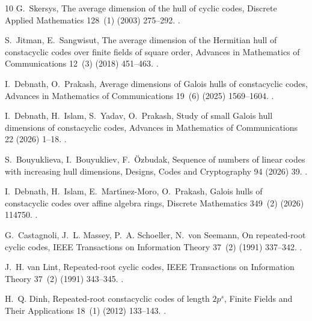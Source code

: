 \documentclass[preprint,12pt,a4paper]{elsarticle}
\theoremstyle{definition}
\theoremstyle{remark}
\begin{document}
\begin{thebibliography}{10}
G.~Skersys, The average dimension of the hull of cyclic codes, Discrete Applied
  Mathematics 128~(1) (2003) 275--292.
\newblock \href {https://doi.org/10.1016/S0166-218X(02)00451-1}
  {}.

S.~Jitman, E.~Sangwisut, The average dimension of the {H}ermitian hull of
  constacyclic codes over finite fields of square order, Advances in
  Mathematics of Communications 12~(3) (2018) 451--463.
\newblock \href {https://doi.org/10.3934/amc.2018027}
  {}.

I.~Debnath, O.~Prakash, Average dimensions of {G}alois hulls of constacyclic
  codes, Advances in Mathematics of Communications 19~(6) (2025) 1569--1604.
\newblock \href {https://doi.org/10.3934/amc.2025010}
  {}.

I.~Debnath, H.~Islam, S.~Yadav, O.~Prakash, Study of small {G}alois hull
  dimensions of constacyclic codes, Advances in Mathematics of Communications
  22 (2026) 1--18.
\newblock \href {https://doi.org/10.3934/amc.2025054}
  {}.

S.~Bouyuklieva, I.~Bouyukliev, F.~{\"O}zbudak, Sequence of numbers of linear
  codes with increasing hull dimensions, Designs, Codes and Cryptography 94
  (2026) 39.
\newblock \href {https://doi.org/10.1007/s10623-025-01776-9}
  {}.

I.~Debnath, H.~Islam, E.~Mart{\'\i}nez-Moro, O.~Prakash, Galois hulls of
  constacyclic codes over affine algebra rings, Discrete Mathematics 349~(2)
  (2026) 114750.
\newblock \href {https://doi.org/10.1016/j.disc.2025.114750}
  {}.

G.~Castagnoli, J.~L. Massey, P.~A. Schoeller, N.~von Seemann, On repeated-root
  cyclic codes, IEEE Transactions on Information Theory 37~(2) (1991) 337--342.
\newblock \href {https://doi.org/10.1109/18.75249}
  {}.

J.~H. van Lint, Repeated-root cyclic codes, IEEE Transactions on Information
  Theory 37~(2) (1991) 343--345.
\newblock \href {https://doi.org/10.1109/18.75250}
  {}.

H.~Q. Dinh, Repeated-root constacyclic codes of length $2p^s$, Finite Fields
  and Their Applications 18~(1) (2012) 133--143.
\newblock \href {https://doi.org/10.1016/j.ffa.2011.07.003}
  {}.


\end{thebibliography}
\end{document}
